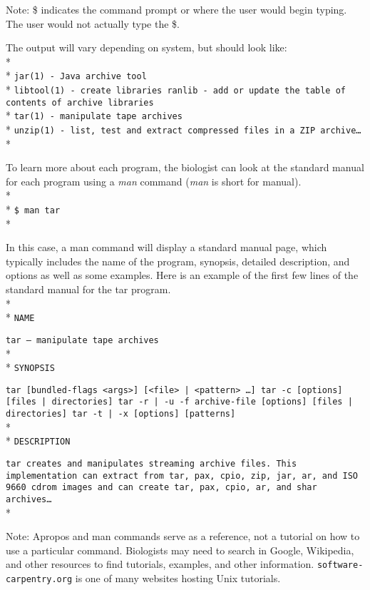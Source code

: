 \documentclass[ChapterTOCs,krantz2]{krantz} %
\begin{document}
Note: \$ indicates the command prompt or where the user would begin typing.
The user would not actually type the \$.

The output will vary depending on system, but should look like:\\* \\*
\texttt{jar(1)    - Java archive tool}\\*
\texttt{libtool(1)    - create libraries ranlib - add or update the table of
contents of archive libraries}\\*
\texttt{tar(1)    - manipulate tape archives}\\*
\texttt{unzip(1)    - list, test and extract compressed files in a
ZIP archive\ldots}\\*

To learn more about each program, 
the biologist can look at the standard manual for each program using a
\emph{man} command (\emph{man} is short for manual).\\* \\*
\texttt{\$ man tar}\\*

In this case, a man command will display a standard manual page, which
typically includes the name of the program, synopsis, detailed description, and
options as well as some examples. Here is an example of the first few lines of
the standard manual for the tar program.\\* \\*
\texttt{NAME}

\texttt{tar -- manipulate tape archives}\\* \\*
\texttt{SYNOPSIS}

\texttt{tar [bundled-flags <args>] [<file> | <pattern> \ldots] tar {-c}
[options] [files | directories] tar {-r | -u} -f archive-file [options] [files
| directories] tar {-t | -x} [options] [patterns]}\\* \\*
\texttt{DESCRIPTION}

\texttt{tar creates and manipulates streaming archive files.  This
implementation can extract from tar, pax, cpio, zip, jar, ar, and ISO 9660
cdrom images and can create tar, pax, cpio, ar, and shar archives\ldots}\\*

Note: Apropos and man commands serve as a reference, not a tutorial on how to use
a particular command. Biologists may need to search in Google,
Wikipedia, and other resources to find tutorials, examples, and other information.
\texttt{software-carpentry.org} is one of many websites hosting Unix tutorials.
\end{document}
